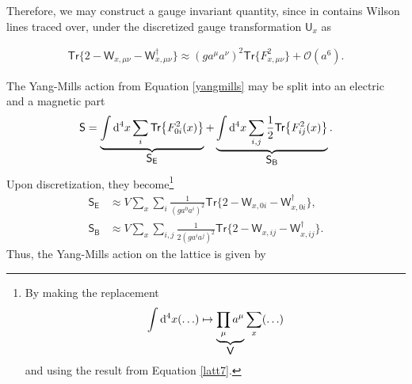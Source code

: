 Therefore, we may construct a gauge invariant quantity, since in contains Wilson lines traced over, under the discretized gauge transformation $\textsf{U}_x$ as

\begin{align}\label{latt7}
    \textsf{Tr}\big\{2-\textsf{W}_{x, \mu \nu}-\textsf{W}_{x, \mu \nu}^{\dagger}\big\} \approx\left(g a^{\mu} a^{\nu}\right)^{2} \textsf{Tr}\big\{F_{x,\mu \nu}^{2}\big\}+\mathcal{O}(a^{6}).
\end{align}

The Yang-Mills action from Equation \cref{yangmills} may be split into an electric and a magnetic part
\begin{align*}
    \textsf{S}=\underbrace{\int \mathrm{d}^{4}x \sum_{i}\textsf{Tr}\big\{F_{0i}^2(x)\big\}}_{\mathclap{\textstyle \textsf{S}_\textsf{E}}}+\underbrace{\int \mathrm{d}^{4}x\sum_{i, j} \frac{1}{2} \textsf{Tr}\big\{F_{ij}^2(x)\big\}}_{\mathclap{\textstyle \textsf{S}_\textsf{B}}}.
\end{align*}
Upon discretization, they become\footnote{By making the replacement
\begin{align*}
    \int \mathrm{d}^{4}x(\ldots)\mapsto \underbrace{\prod\limits_{\mu}a^\mu}_{\mathclap{\textstyle \textsf{V}}}\sum_x(\ldots)
\end{align*}
and using the result from Equation \cref{latt7}.
}
\begin{align*}
    \textsf{S}_\textsf{E}& \approx V \sum_{x} \sum_{i} \frac{1}{\left(g a^{0} a^{i}\right)^{2}} \textsf{Tr}\big\{2-\textsf{W}_{x, 0 i}-\textsf{W}_{x, 0 i}^{\dagger}\big\}, \\
    \textsf{S}_\textsf{B}& \approx V \sum_{x} \sum_{i, j} \frac{1}{2\left(g a^{i} a^{j}\right)^{2}} \textsf{Tr}\big\{2-\textsf{W}_{x, i j}-\textsf{W}_{x, i j}^{\dagger}\big\}.
\end{align*}
Thus, the Yang-Mills action on the lattice is given by


